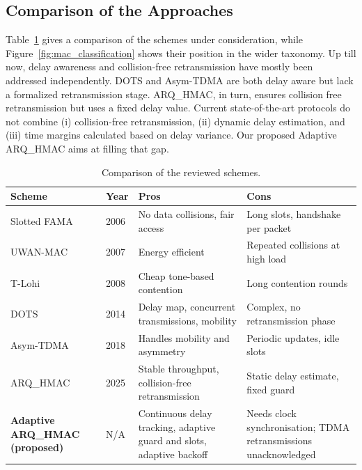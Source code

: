 \documentclass{article}
\begin{document}
\subsection{Comparison of the Approaches} \label{sec:comparison}
Table~\ref{tab:comparison} gives a comparison of the schemes under consideration, while Figure~\ref{fig:mac_classification} shows their position in the wider taxonomy. Up till now, delay awareness and collision-free retransmission have mostly been addressed independently. DOTS and Asym-TDMA are both delay aware but lack a formalized retransmission stage. ARQ\_HMAC, in turn, ensures collision free retransmission but uses a fixed delay value. Current state-of-the-art protocols do not combine (i) collision-free retransmission, (ii) dynamic delay estimation, and (iii) time margins calculated based on delay variance. Our proposed Adaptive ARQ\_HMAC aims at filling that gap.

\begin{table}[H]
\centering
\caption{Comparison of the reviewed schemes.}
\label{tab:comparison}
\small
{}
\begin{tabular}{@{}>{\raggedright\arraybackslash}p{2.6cm} l
>{\raggedright\arraybackslash}p{4.3cm}
>{\raggedright\arraybackslash}p{4.3cm}@{}}
\toprule
Scheme & Year & Pros & Cons \\
\midrule
Slotted FAMA~\cite{slottedfama2006} & 2006 & No data collisions, fair access & Long slots, handshake per packet \\
UWAN-MAC~\cite{uwmac2007} & 2007 & Energy efficient & Repeated collisions at high load \\
T-Lohi~\cite{tlohi2008} & 2008 & Cheap tone-based contention & Long contention rounds \\
DOTS~\cite{dots2014} & 2014 & Delay map, concurrent transmissions, mobility & Complex, no retransmission phase \\
Asym-TDMA~\cite{cho2018} & 2018 & Handles mobility and asymmetry & Periodic updates, idle slots \\
ARQ\_HMAC~\cite{dao2025} & 2025 & Stable throughput, collision-free retransmission & Static delay estimate, fixed guard \\
\textbf{Adaptive ARQ\_HMAC (proposed)} & N/A & Continuous delay tracking, adaptive guard and slots, adaptive backoff & Needs clock synchronisation; TDMA retransmissions unacknowledged \\
\bottomrule
\end{tabular}
\end{table}
\end{document}
